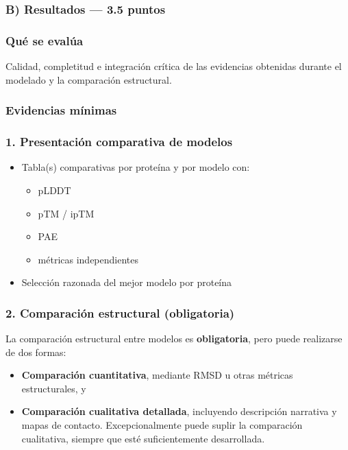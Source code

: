 \documentclass[
  11pt,
  a4paper,
  twoside]{scrreprt}
\providecommand{\tightlist}{%
  \setlength{\itemsep}{0pt}\setlength{\parskip}{0pt}}
\begin{document}
\subsubsection{B) Resultados --- 3.5
puntos}\label{b-resultados-3.5-puntos}

\subsubsection{Qué se evalúa}\label{quuxe9-se-evaluxfaa-1}

Calidad, completitud e integración crítica de las evidencias obtenidas
durante el modelado y la comparación estructural.

\subsubsection{Evidencias mínimas}\label{evidencias-muxednimas-1}

\subsubsection{1. Presentación comparativa de
modelos}\label{presentaciuxf3n-comparativa-de-modelos}

\begin{itemize}
\tightlist
\item
  Tabla(s) comparativas por proteína y por modelo con:

  \begin{itemize}
  \tightlist
  \item
    pLDDT
  \item
    pTM / ipTM
  \item
    PAE
  \item
    métricas independientes
  \end{itemize}
\item
  Selección razonada del mejor modelo por proteína
\end{itemize}

\subsubsection{2. Comparación estructural
(obligatoria)}\label{comparaciuxf3n-estructural-obligatoria}

La comparación estructural entre modelos es \textbf{obligatoria}, pero
puede realizarse de dos formas:

\begin{itemize}
\item
  \textbf{Comparación cuantitativa}, mediante RMSD u otras métricas
  estructurales, y
\item
  \textbf{Comparación cualitativa detallada}, incluyendo descripción
  narrativa y mapas de contacto. Excepcionalmente puede suplir la
  comparación cualitativa, siempre que esté suficientemente
  desarrollada.
\end{itemize}
\end{document}

